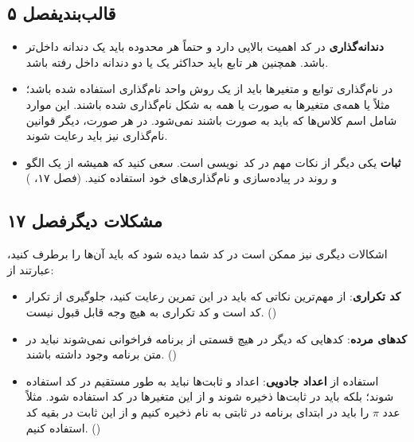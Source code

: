 \documentclass{utap}
\newcommand{\chap}[1]{\hfill\normalfont\normalsize فصل #1}
\begin{document}
\subsection[قالب‌بندی]{قالب‌بندی\chap{۵}}
  \begin{itemize}
        \item
\textbf{دندانه‌گذاری}
در کد اهمیت بالایی دارد و حتماً هر محدوده باید یک دندانه داخل‌تر باشد. همچنین هر تابع باید حداکثر یک یا دو دندانه داخل رفته باشد.
    \item
در نام‌گذاری توابع و متغیر‌ها باید از یک روش واحد نام‌گذاری استفاده شده باشد؛ مثلاً یا همه‌ی متغیر‌ها به صورت  یا همه به شکل  نام‌گذاری شده باشند. این موارد شامل اسم کلاس‌ها که باید به صورت  باشند نمی‌شود. در هر صورت، دیگر قوانین نام‌گذاری نیز باید رعایت شوند.
    \item
\textbf{ثبات} یکی دیگر از نکات مهم در کد~نویسی است. سعی کنید که همیشه از یک الگو و روند در پیاده‌سازی و نام‌گذاری‌های خود استفاده کنید. (فصل ۱۷، )
    \end{itemize}

\subsection[مشکلات دیگر]{مشکلات دیگر\chap{۱۷}}
اشکالات دیگری نیز ممکن است در کد شما دیده شود که باید آن‌ها را برطرف کنید، عبارتند از:
      \begin{itemize}
        \item \textbf{کد تکراری}:
از مهم‌ترین نکاتی که باید در این تمرین رعایت کنید، جلوگیری از تکرار کد است و کد تکراری به هیچ وجه قابل قبول نیست. ()
        \item \textbf{کدهای مرده}:
کدهایی که دیگر در هیچ قسمتی از برنامه فراخوانی نمی‌شوند نباید در متن برنامه وجود داشته باشند. ()
        \item استفاده از \textbf{اعداد جادویی}:
اعداد و ثابت‌ها نباید به طور مستقیم در کد استفاده شوند؛ بلکه باید در ثابت‌ها ذخیره شوند و از این متغیر‌ها در کد استفاده شود. مثلاً عدد $\pi$ را باید در ابتدای برنامه در ثابتی به نام  ذخیره کنیم و از این ثابت در بقیه کد استفاده کنیم. ()
       \end{itemize}
\end{document}
